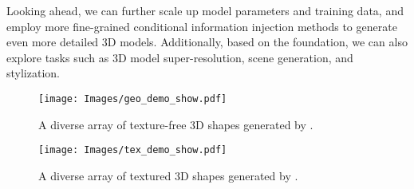 Looking ahead, we can further scale up model parameters and training data, and employ more fine-grained conditional information injection methods to generate even more detailed 3D models. Additionally, based on the \method{} foundation, we can also explore tasks such as 3D model super-resolution, scene generation, and stylization.

\begin{figure*}
    \centering
    \texttt{[image: Images/geo\_demo\_show.pdf]}
    \caption{A diverse array of texture-free 3D shapes generated by \method{}.}
    \label{fig:geo_demo_show}
\end{figure*}


\begin{figure*}
    \centering
    \texttt{[image: Images/tex\_demo\_show.pdf]}
    \caption{A diverse array of textured 3D shapes generated by \method{}.}
    \label{fig:texture_demo_show}
\end{figure*}